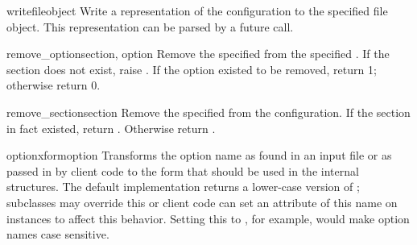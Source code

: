 \begin{methoddesc}{write}{fileobject}
Write a representation of the configuration to the specified file
object.  This representation can be parsed by a future 
call.
\end{methoddesc}

\begin{methoddesc}{remove_option}{section, option}
Remove the specified  from the specified .
If the section does not exist, raise . 
If the option existed to be removed, return 1; otherwise return 0.
\end{methoddesc}

\begin{methoddesc}{remove_section}{section}
Remove the specified  from the configuration.
If the section in fact existed, return .
Otherwise return .
\end{methoddesc}

\begin{methoddesc}{optionxform}{option}
Transforms the option name  as found in an input file or
as passed in by  client code to the form that should be used in the
internal structures.  The default implementation returns a lower-case
version of ; subclasses may override this or client code
can set an attribute of this name on instances to affect this
behavior.  Setting this to , for example, would make
option names case sensitive.
\end{methoddesc}
